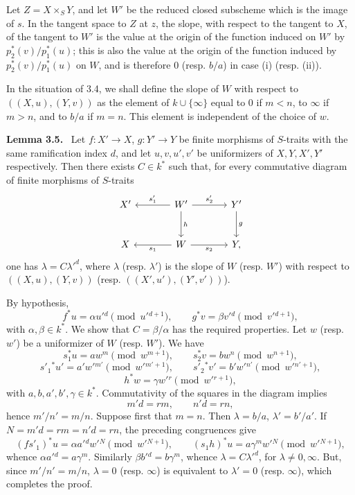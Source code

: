 \documentclass[11pt]{article}
\newenvironment{statement}[1]{\par\medskip\noindent\textbf{#1.}\ }{\par\medskip}
\begin{document}
Let $Z=X\times_SY$, and let $W'$ be the reduced closed subscheme which is the image of $s$. In the tangent space to $Z$ at $z$, the slope, with respect to the tangent to $X$, of the tangent to $W'$ is the value at the origin of the function induced on $W'$ by $p_2^*(v)/p_1^*(u)$; this is also the value at the origin of the function induced by $p_2^*(v)/p_1^*(u)$ on $W$, and is therefore $0$ (resp. $b/a$) in case (i) (resp. (ii)).

In the situation of 3.4, we shall define the slope of $W$ with respect to $((X,u),(Y,v))$ as the element of $k\cup\{\infty\}$ equal to $0$ if $m<n$, to $\infty$ if $m>n$, and to $b/a$ if $m=n$. This element is independent of the choice of $w$.

\begin{statement}{Lemma 3.5}
Let $f:X'\to X$, $g:Y'\to Y$ be finite morphisms of $S$-traits with the same ramification index $d$, and let $u,v,u',v'$ be uniformizers of $X,Y,X',Y'$ respectively. Then there exists $C\in k^*$ such that, for every commutative diagram of finite morphisms of $S$-traits
\[
\begin{tikzcd}[column sep=large,row sep=large]
X' & W' \arrow[l,"s'_1"'] \arrow[r,"s'_2"] \arrow[d,"h"] & Y' \arrow[d,"g"]\\
X & W \arrow[l,"s_1"] \arrow[r,"s_2"'] & Y ,
\end{tikzcd}
\]
one has $\lambda=C{\lambda'}^d$, where $\lambda$ (resp. $\lambda'$) is the slope of $W$ (resp. $W'$) with respect to $((X,u),(Y,v))$ (resp. $((X',u'),(Y',v'))$).
\end{statement}

By hypothesis,
\[
f^*u=\alpha u'{}^d\pmod {u'{}^{d+1}},\qquad
g^*v=\beta v'{}^d\pmod {v'{}^{d+1}},
\]
with $\alpha,\beta\in k^*$. We show that $C=\beta/\alpha$ has the required properties. Let $w$ (resp. $w'$) be a uniformizer of $W$ (resp. $W'$). We have
\[
s_1^*u=aw^m\pmod {w^{m+1}},\qquad
s_2^*v=bw^n\pmod {w^{n+1}},
\]
\[
s'_1{}^*u'=a'w'{}^{m'}\pmod {w'{}^{m'+1}},\qquad
s'_2{}^*v'=b'w'{}^{n'}\pmod {w'{}^{n'+1}},
\]
\[
h^*w=\gamma w'{}^r\pmod {w'{}^{r+1}},
\]
with $a,b,a',b',\gamma\in k^*$. Commutativity of the squares in the diagram implies
\[
m'd=rm,\qquad n'd=rn,
\]
hence $m'/n'=m/n$. Suppose first that $m=n$. Then $\lambda=b/a$, $\lambda'=b'/a'$. If $N=m'd=rm=n'd=rn$, the preceding congruences give
\[
(fs'_1)^*u=\alpha a'{}^d w'{}^N\pmod {w'{}^{N+1}},\qquad
(s_1h)^*u=a\gamma^m w'{}^N\pmod {w'{}^{N+1}},
\]
whence $\alpha a'{}^d=a\gamma^m$. Similarly $\beta b'{}^d=b\gamma^m$, whence $\lambda=C{\lambda'}^d$, for $\lambda\ne0,\infty$. But, since $m'/n'=m/n$, $\lambda=0$ (resp. $\infty$) is equivalent to $\lambda'=0$ (resp. $\infty$), which completes the proof.
\end{document}
